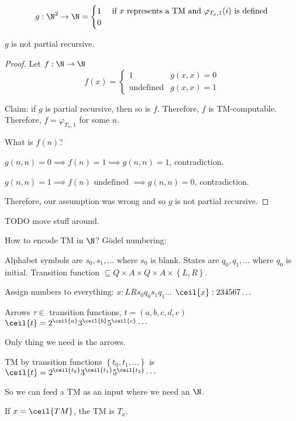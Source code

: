 \documentclass{article}
\begin{document}
\begin{definition}
    \[
        g:\N^2\to\N=\begin{cases}
        1 & \text{ if \(x\) represents a TM and \(\varphi_{T_x, 1}(i)\) is defined} \\
        0
        \end{cases}
    \]
    \begin{theorem}
        \(g\) is not partial recursive.
        
        \begin{proof}
            Let \(f:\N\to\N\)
            \[
                f(x) = \begin{cases}
                    1 & g(x, x) = 0 \\
                    \text{undefined} & g(x, x) = 1
                \end{cases}
            \]
            
            Claim: if \(g\) is partial recursive, then so is \(f\).
            Therefore, \(f\) is TM-computable.
            Therefore, \(f = \varphi_{T_n,1}\) for some \(n\).

            What is \(f(n)\)?

            \(g(n,n)=0 \implies f(n) = 1 \implies g(n, n) = 1\), contradiction.

            \(g(n,n)=1 \implies f(n) \text{ undefined } \implies g(n, n) = 0\), contradiction.

            Therefore, our assumption was wrong and so \(g\) is not partial recursive.
        \end{proof}
    \end{theorem}


    TODO move stuff around.
    
    How to encode TM in \(\N\)?
    Gödel numbering:

    Alphabet symbols are \(s_0, s_1, \ldots\) where \(s_0\) is blank.
    States are \(q_0, q_1, \ldots\) where \(q_0\) is initial.
    Transition function \(\subseteq Q\times A \times Q \times A \times \left\{ L, R \right\}\).

    Assign numbers to everything: \(x: L R s_0 q_0 s_1 q_1 \ldots\)
    \(\ceil{x}: 2 3 4 5 6 7 \ldots\)

    Arrows \(\tau \in \) transition functions, \(t = \left( a, b, c, d, e \right)\)
    \(\ceil{t} = 2^{\ceil{a}} 3^{\ceil{b}} 5^{\ceil{c}} \cdots\)

    Only thing we need is the arrows.
    
    TM by transition functions \(\left\{ t_0, t_1, \ldots \right\}\)
    is 
    \(\ceil{t} = 2^{\ceil{t_0}} 3^{\ceil{t_1}} 5^{\ceil{t_2}} \cdots\)
    
    So we can feed a TM as an input where we need an \(\N\).
    
    If \(x = \ceil{TM}\), the TM is \(T_x\).
\end{definition}
\end{document}
